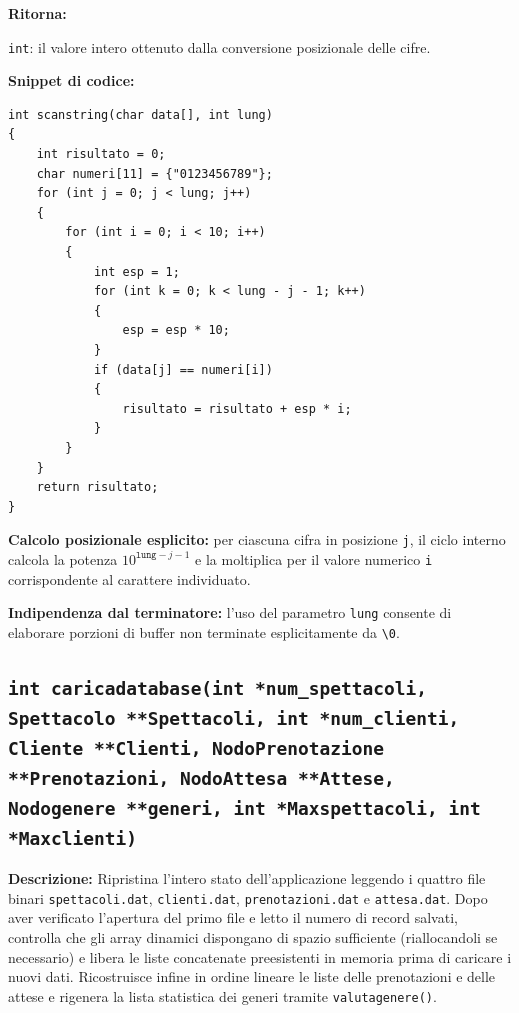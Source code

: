 \documentclass[11pt,a4paper,oneside,openany]{book}
\newenvironment{listacomp}{%
    \small
    \begin{list}{\textendash}{%
        \setlength{\topsep}{2pt}%
        \setlength{\partopsep}{0pt}%
        \setlength{\itemsep}{1pt}%
        \setlength{\parsep}{0pt}%
        \setlength{\leftmargin}{1.2em}%
    }%
}{%
    \end{list}%
}
\begin{document}
\noindent\textbf{Ritorna:}
\begin{listacomp}
    \item \texttt{int}: il valore intero ottenuto dalla conversione posizionale delle cifre.
\end{listacomp}

\noindent\textbf{Snippet di codice:}
\begin{lstlisting}[caption={Conversione posizionale da stringa numerica a intero in scanstring()}]
int scanstring(char data[], int lung)
{
    int risultato = 0;
    char numeri[11] = {"0123456789"};
    for (int j = 0; j < lung; j++)
    {
        for (int i = 0; i < 10; i++)
        {
            int esp = 1;
            for (int k = 0; k < lung - j - 1; k++)
            {
                esp = esp * 10;
            }
            if (data[j] == numeri[i])
            {
                risultato = risultato + esp * i;
            }
        }
    }
    return risultato;
}
\end{lstlisting}

\begin{listacomp}
    \item \textbf{Calcolo posizionale esplicito:} per ciascuna cifra in posizione \texttt{j}, il ciclo interno calcola la potenza $10^{\texttt{lung}-j-1}$ e la moltiplica per il valore numerico \texttt{i} corrispondente al carattere individuato.
    \item \textbf{Indipendenza dal terminatore:} l'uso del parametro \texttt{lung} consente di elaborare porzioni di buffer non terminate esplicitamente da \texttt{\textbackslash 0}.
\end{listacomp}

\subsection[caricadatabase()]{\texttt{int caricadatabase(int *num\_spettacoli, Spettacolo **Spettacoli, int *num\_clienti, Cliente **Clienti, NodoPrenotazione **Prenotazioni, NodoAttesa **Attese, Nodogenere **generi, int *Maxspettacoli, int *Maxclienti)}}

\noindent\textbf{Descrizione:}
Ripristina l'intero stato dell'applicazione leggendo i quattro file binari \texttt{spettacoli.dat}, \texttt{clienti.dat}, \texttt{prenotazioni.dat} e \texttt{attesa.dat}. Dopo aver verificato l'apertura del primo file e letto il numero di record salvati, controlla che gli array dinamici dispongano di spazio sufficiente (riallocandoli se necessario) e libera le liste concatenate preesistenti in memoria prima di caricare i nuovi dati. Ricostruisce infine in ordine lineare le liste delle prenotazioni e delle attese e rigenera la lista statistica dei generi tramite \texttt{valutagenere()}.
\end{document}
